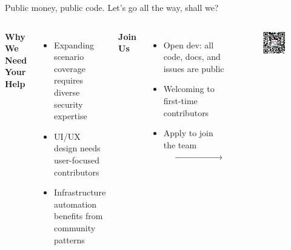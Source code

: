 \documentclass[aspectratio=169]{beamer}
\begin{document}
\begin{frame}[squeeze]{Public money, public code. Let's go all the way, shall we?}
  \begin{columns}[T]
    \textbf{Why We Need Your Help}
    \begin{itemize}
      \item Expanding scenario coverage requires diverse security expertise
      \item UI/UX design needs user-focused contributors
      \item Infrastructure automation benefits from community patterns
    \end{itemize}
    
    \textbf{Join Us}
    \begin{itemize}
      \item Open dev: all code, docs, and issues are public
      \item Welcoming to first-time contributors
      \item Apply to join the team $\xrightarrow{\hspace{4cm}}$
    \end{itemize}
    
    \vspace{10mm}
    \begin{figure}
      \centering
      \includegraphics[width=\textwidth]{images/work-with-us-qrcode.png}
    \end{figure}
  \end{columns}
\end{frame}
\end{document}
